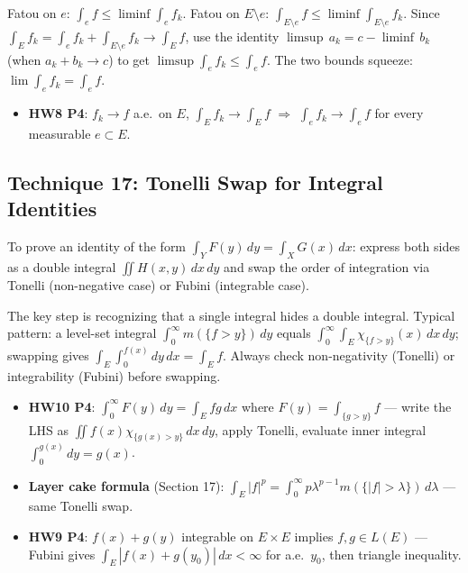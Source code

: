 \documentclass[11pt]{report}
\begin{document}
\begin{rembox}[Strategy]
Fatou on $e$: $\int_e f \leq \liminf \int_e f_k$. Fatou on $E \setminus e$: $\int_{E \setminus e} f \leq \liminf \int_{E \setminus e} f_k$. Since $\int_E f_k = \int_e f_k + \int_{E \setminus e} f_k \to \int_E f$, use the identity $\limsup\, a_k = c - \liminf\, b_k$ (when $a_k + b_k \to c$) to get $\limsup \int_e f_k \leq \int_e f$. The two bounds squeeze: $\lim \int_e f_k = \int_e f$.
\end{rembox}

\begin{exbox}
\begin{itemize}
\item \textbf{HW8 P4}: $f_k \to f$ a.e.\ on $E$, $\int_E f_k \to \int_E f$ $\Rightarrow$ $\int_e f_k \to \int_e f$ for every measurable $e \subset E$.
\end{itemize}
\end{exbox}

\subsection{Technique 17: Tonelli Swap for Integral Identities}

To prove an identity of the form $\int_Y F(y)\,dy = \int_X G(x)\,dx$: express both sides as a double integral $\iint H(x,y)\,dx\,dy$ and swap the order of integration via Tonelli (non-negative case) or Fubini (integrable case).

\begin{rembox}[Strategy]
The key step is recognizing that a single integral hides a double integral. Typical pattern: a level-set integral $\int_0^\infty m(\{f > y\})\,dy$ equals $\int_0^\infty \int_E \chi_{\{f > y\}}(x)\,dx\,dy$; swapping gives $\int_E \int_0^{f(x)} dy\,dx = \int_E f$. Always check non-negativity (Tonelli) or integrability (Fubini) before swapping.
\end{rembox}

\begin{exbox}
\begin{itemize}
\item \textbf{HW10 P4}: $\int_0^\infty F(y)\,dy = \int_E fg\,dx$ where $F(y) = \int_{\{g > y\}} f$ --- write the LHS as $\iint f(x)\chi_{\{g(x)>y\}}\,dx\,dy$, apply Tonelli, evaluate inner integral $\int_0^{g(x)} dy = g(x)$.
\item \textbf{Layer cake formula} (Section 17): $\int_E |f|^p = \int_0^\infty p\lambda^{p-1} m(\{|f| > \lambda\})\,d\lambda$ --- same Tonelli swap.
\item \textbf{HW9 P4}: $f(x) + g(y)$ integrable on $E \times E$ implies $f, g \in L(E)$ --- Fubini gives $\int_E |f(x) + g(y_0)|\,dx < \infty$ for a.e.\ $y_0$, then triangle inequality.
\end{itemize}
\end{exbox}
\end{document}
